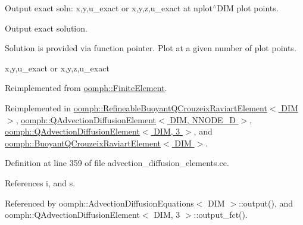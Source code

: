Output exact soln\+: x,y,u\+\_\+exact or x,y,z,u\+\_\+exact at nplot$^\wedge$\+D\+IM plot points. 

Output exact solution.

Solution is provided via function pointer. Plot at a given number of plot points.

x,y,u\+\_\+exact or x,y,z,u\+\_\+exact 

Reimplemented from \hyperlink{classoomph_1_1FiniteElement_a22b695c714f60ee6cd145be348042035}{oomph\+::\+Finite\+Element}.



Reimplemented in \hyperlink{classoomph_1_1RefineableBuoyantQCrouzeixRaviartElement_a9f9feaf2d6003f2328741de2987fd0d1}{oomph\+::\+Refineable\+Buoyant\+Q\+Crouzeix\+Raviart\+Element$<$ D\+I\+M $>$}, \hyperlink{classoomph_1_1QAdvectionDiffusionElement_a42d9f526bc4bcc8fe51c6dbb1d216b4c}{oomph\+::\+Q\+Advection\+Diffusion\+Element$<$ D\+I\+M, N\+N\+O\+D\+E\+\_\+D $>$}, \hyperlink{classoomph_1_1QAdvectionDiffusionElement_a42d9f526bc4bcc8fe51c6dbb1d216b4c}{oomph\+::\+Q\+Advection\+Diffusion\+Element$<$ D\+I\+M, 3 $>$}, and \hyperlink{classoomph_1_1BuoyantQCrouzeixRaviartElement_ad36c2a18f2de8b00f76baccc15b768c2}{oomph\+::\+Buoyant\+Q\+Crouzeix\+Raviart\+Element$<$ D\+I\+M $>$}.



Definition at line 359 of file advection\+\_\+diffusion\+\_\+elements.\+cc.



References i, and s.



Referenced by oomph\+::\+Advection\+Diffusion\+Equations$<$ D\+I\+M $>$\+::output(), and oomph\+::\+Q\+Advection\+Diffusion\+Element$<$ D\+I\+M, 3 $>$\+::output\+\_\+fct().

\mbox{\label{classoomph_1_1AdvectionDiffusionEquations_affb6feff30ffb8617315e555e1bb7185}} 
